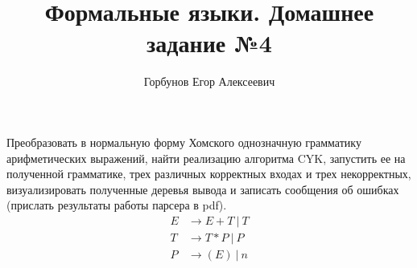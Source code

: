 


\title{Формальные языки. Домашнее задание №4}
\author{Горбунов Егор Алексеевич}


\maketitle

\begin{task}[1]
	Преобразовать в нормальную форму Хомского однозначную грамматику арифметических выражений, найти реализацию алгоритма CYK, запустить ее на полученной грамматике, трех различных корректных входах и трех некорректных, визуализировать полученные деревья вывода и записать сообщения об ошибках (прислать результаты работы парсера в pdf).
	\begin{align*}
		E &\rightarrow E + T\ |\ T \\
		T &\rightarrow T * P\ |\ P \\
		P &\rightarrow (E)\ |\ n
	\end{align*}
\end{task}
